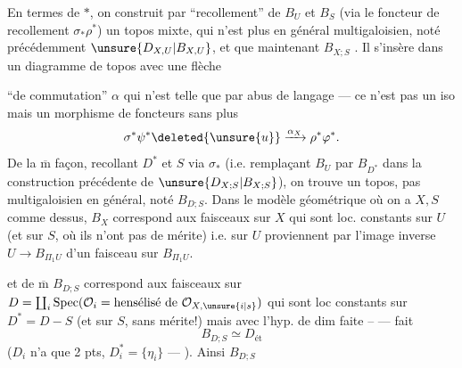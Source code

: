 En termes de $*$, on construit par ``recollement'' de $B_U$ et  $B_S$ (via le foncteur de recollement $\sigma_*\rho^*$) un topos mixte, qui n'est plus en général multigaloisien, noté précédemment $\unsure{D_{X,U}|B_{X,U}}$, et que  maintenant   $B_{X;S}$   . Il s'insère dans un diagramme de topos
avec une flèche


``de commutation'' $\alpha$ qui n'est telle que par abus de langage --- ce n'est pas un iso  mais un morphisme de foncteurs sans plus
\[
 \sigma^*\psi^*\deleted{\unsure{u}}\xrightarrow{\alpha_X}\rho^*\varphi^*.
\]
De la $\overline{\mathrm m}$ façon, recollant $D^*$ et $S$ via $\sigma_*$ (i.e. remplaçant $B_U$ par $B_{D^*}$ dans la construction précédente de $\unsure{D_{X;S}|B_{X;S}}$), on trouve un topos, pas multigaloisien en général, noté $B_{D;S}$. Dans le  modèle géométrique où on a $X,S$ comme dessus,
$B_X$ correspond aux faisceaux sur $X$ qui sont  loc. constants sur $U$ (et sur $S$, où ils n'ont pas de mérite) i.e. sur $U$ proviennent par l'image inverse   $U\longrightarrow B_{\Pi_1 U}$ d'un faisceau sur $B_{\Pi_1 U}$.

et de $\overline{\mathrm m}$ $B_{D;S}$ correspond aux faisceaux sur $D=\coprod_i\operatorname{Spec}(\mathcal O_i=\text{hensélisé de }\mathcal O_{X,\unsure{i|s}})$  qui sont loc constants sur $D^*=D-S$ (et sur $S$, sans mérite!) mais avec l'hyp. de dim faite -- ---  fait
\[
 B_{D;S}\simeq D_{\text{ét}}
\]
($D_i$ n'a que 2 pts, $D_i^*=\{\eta_i\}$ --- ). Ainsi $B_{D;S}$ 



